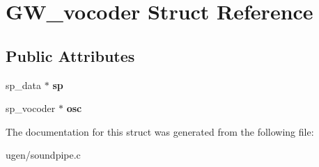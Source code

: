 \hypertarget{structGW__vocoder}{}\section{G\+W\+\_\+vocoder Struct Reference}
\label{structGW__vocoder}
\subsection*{Public Attributes}
\begin{DoxyCompactItemize}
\item 
\hypertarget{structGW__vocoder_afa8cee6f360ab4f4a17fb3e04b3b3ec2}{}\label{structGW__vocoder_afa8cee6f360ab4f4a17fb3e04b3b3ec2} 
sp\+\_\+data $\ast$ {\bfseries sp}
\item 
\hypertarget{structGW__vocoder_ab58bacb009a80ec34898128b59c60495}{}\label{structGW__vocoder_ab58bacb009a80ec34898128b59c60495} 
sp\+\_\+vocoder $\ast$ {\bfseries osc}
\end{DoxyCompactItemize}


The documentation for this struct was generated from the following file\+:\begin{DoxyCompactItemize}
\item 
ugen/soundpipe.\+c\end{DoxyCompactItemize}
